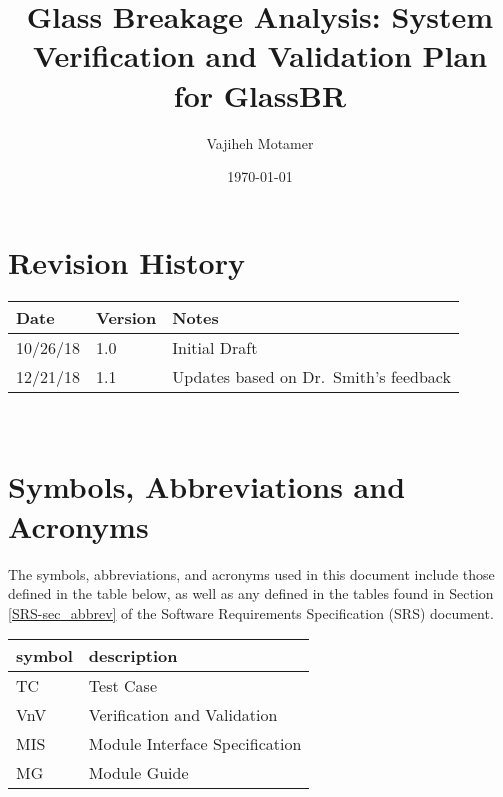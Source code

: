\documentclass[12pt, titlepage]{article}
\newcommand{\progname}{GlassBR}
\begin{document}
\title{Glass Breakage Analysis: System Verification and Validation Plan for \progname{}
  } 
\author{Vajiheh Motamer}
\date{\today}
	
\maketitle


\section{Revision History}

\begin{tabularx}{\textwidth}{p{3cm}p{2cm}X}
\toprule {\bf Date} & {\bf Version} & {\bf Notes}\\
\midrule
10/26/18 & 1.0 & Initial Draft\\
12/21/18 & 1.1 & Updates based on Dr.~Smith's feedback\\
\bottomrule
\end{tabularx}

~\newpage

\section{Symbols, Abbreviations and Acronyms}
The symbols, abbreviations, and acronyms used in this document include those 
defined in the table below, as well as any defined in the tables found in 
Section \ref{SRS-sec_abbrev} of the Software Requirements Specification (SRS) 
document.
\newline

\renewcommand{\arraystretch}{1.2}
\begin{tabular}{l l} 
  \toprule		
  \textbf{symbol} & \textbf{description}\\
  \midrule 
    TC & Test Case\\
  VnV & Verification and Validation\\
  MIS & Module Interface Specification\\
  MG & Module Guide\\
  \bottomrule
\end{tabular}\\

\newpage

\tableofcontents

\listoftables

\newpage
\end{document}
